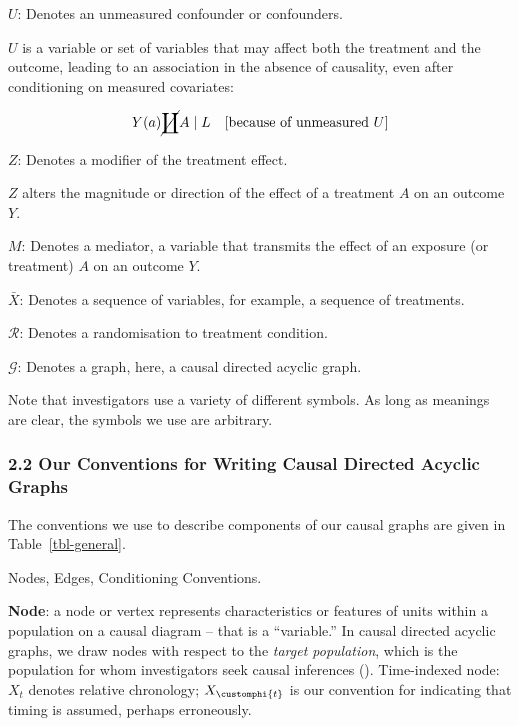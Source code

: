 \documentclass[
  single column]{article}
\begin{document}
\textbf{\(U\)}: Denotes an unmeasured confounder or confounders.

\(U\) is a variable or set of variables that may affect both the
treatment and the outcome, leading to an association in the absence of
causality, even after conditioning on measured covariates:

\[
Y(a) \cancel{\coprod} A \mid L \quad \text{[because of unmeasured } U]
\]

\textbf{\(Z\)}: Denotes a modifier of the treatment effect.

\(Z\) alters the magnitude or direction of the effect of a treatment
\(A\) on an outcome \(Y\).

\textbf{\(M\)}: Denotes a mediator, a variable that transmits the effect
of an exposure (or treatment) \(A\) on an outcome \(Y\).

\textbf{\(\bar{X}\)}: Denotes a sequence of variables, for example, a
sequence of treatments.

\textbf{\(\mathcal{R}\)}: Denotes a randomisation to treatment
condition.

\textbf{\(\mathcal{G}\)}: Denotes a graph, here, a causal directed
acyclic graph.

Note that investigators use a variety of different symbols. As long as
meanings are clear, the symbols we use are arbitrary.

\subsubsection{2.2 Our Conventions for Writing Causal Directed Acyclic
Graphs}\label{our-conventions-for-writing-causal-directed-acyclic-graphs}

The conventions we use to describe components of our causal graphs are
given in Table~\ref{tbl-general}.

\begin{table}

\caption{\label{tbl-general}Nodes, Edges, Conditioning Conventions.}

\centering{

\terminologygeneraldags

}

\end{table}%

\textbf{Node}: a node or vertex represents characteristics or features
of units within a population on a causal diagram -- that is a
``variable.'' In causal directed acyclic graphs, we draw nodes with
respect to the \emph{target population}, which is the population for
whom investigators seek causal inferences
(). Time-indexed
node: \(X_t\) denotes relative chronology; \(X_{\customphi{t}}\) is our
convention for indicating that timing is assumed, perhaps erroneously.
\end{document}
